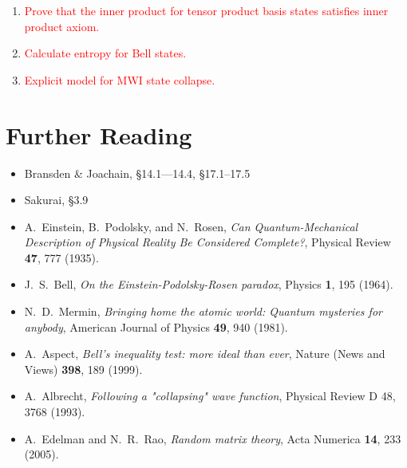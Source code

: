 \documentclass[pra,12pt]{revtex4}
\begin{document}
\begin{enumerate}
\item \textcolor{red}{Prove that the inner product for tensor product basis states satisfies inner product axiom.}
\item \textcolor{red}{Calculate entropy for Bell states.}
\item \textcolor{red}{Explicit model for MWI state collapse.}
\end{enumerate}

\section*{Further Reading}

\begin{itemize}

\item Bransden \& Joachain, \S14.1---14.4, \S17.1--17.5

\item Sakurai, \S3.9

\item A.~Einstein, B.~Podolsky, and N.~Rosen,
  \textit{Can Quantum-Mechanical Description of Physical Reality Be
    Considered Complete?}, Physical Review \textbf{47}, 777 (1935).
  \label{cite:epr}

\item J.~S.~Bell, \textit{On the Einstein-Podolsky-Rosen paradox},
  Physics \textbf{1}, 195 (1964). \label{cite:bell}
  
\item N.~D.~Mermin, \textit{Bringing home the atomic world: Quantum
  mysteries for anybody}, American Journal of Physics \textbf{49}, 940
  (1981). \label{cite:mermin}

\item A.~Aspect, \textit{Bell's inequality test: more ideal than ever},
  Nature (News and Views) \textbf{398}, 189 (1999). \label{cite:aspect}

\item A.~Albrecht, \textit{Following a "collapsing" wave function},
  Physical Review D \textrm{48}, 3768 (1993).
\label{cite:albrecht}

\item A.~Edelman and N.~R.~Rao, \textit{Random matrix theory}, Acta
  Numerica \textbf{14}, 233 (2005).
\label{cite:edelman}
\end{itemize}
\end{document}

